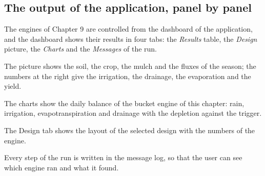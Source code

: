 \subsection{The output of the application, panel by panel}
The engines of Chapter 9 are controlled from the dashboard of the application, and the dashboard shows their results in four tabs: the \emph{Results} table, the \emph{Design} picture, the \emph{Charts} and the \emph{Messages} of the run.

The picture shows the soil, the crop, the mulch and the fluxes of the season; the numbers at the right give the irrigation, the drainage, the evaporation and the yield.


The charts show the daily balance of the bucket engine of this chapter: rain, irrigation, evapotranspiration and drainage with the depletion against the trigger.


The Design tab shows the layout of the selected design with the numbers of the engine.


Every step of the run is written in the message log, so that the user can see which engine ran and what it found.


